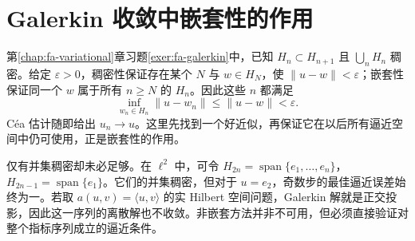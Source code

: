 \section{Galerkin 收敛中嵌套性的作用}
第\ref{chap:fa-variational}章习题\ref{exer:fa-galerkin}中，已知 $H_n\subset H_{n+1}$ 且 $\bigcup_nH_n$ 稠密。给定 $\varepsilon>0$，稠密性保证存在某个 $N$ 与 $w\in H_N$，使 $\|u-w\|<\varepsilon$；嵌套性保证同一个 $w$ 属于所有 $n\geq N$ 的 $H_n$。因此这些 $n$ 都满足
\[
 \inf_{w_n\in H_n}\|u-w_n\|\leq\|u-w\|<\varepsilon.
\]
Céa 估计随即给出 $u_n\to u$。这里先找到一个好近似，再保证它在以后所有逼近空间中仍可使用，正是嵌套性的作用。

仅有并集稠密却未必足够。在 $\ell^2$ 中，可令 $H_{2n}=\operatorname{span}\{e_1,\ldots,e_n\}$，$H_{2n-1}=\operatorname{span}\{e_1\}$。它们的并集稠密，但对于 $u=e_2$，奇数步的最佳逼近误差始终为一。若取 $a(u,v)=\langle u,v\rangle$ 的实 Hilbert 空间问题，Galerkin 解就是正交投影，因此这一序列的离散解也不收敛。非嵌套方法并非不可用，但必须直接验证对整个指标序列成立的逼近条件。


